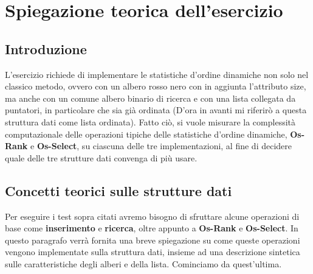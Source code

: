 \section{Spiegazione teorica dell'esercizio}
\subsection{Introduzione}
L'esercizio richiede di implementare le statistiche d'ordine dinamiche non solo nel classico metodo, ovvero con un albero rosso nero con in aggiunta l'attributo size, ma anche con un comune albero binario di ricerca e con una lista collegata da puntatori, in particolare che sia già ordinata (D'ora in avanti mi riferirò a questa struttura dati come lista ordinata). Fatto ciò, si vuole misurare la complessità computazionale delle operazioni tipiche delle statistiche d'ordine dinamiche, \textbf{Os-Rank} e \textbf{Os-Select}, su ciascuna delle tre implementazioni, al fine di decidere quale delle tre strutture dati convenga di più usare.

\subsection{Concetti teorici sulle strutture dati}
Per eseguire i test sopra citati avremo bisogno di sfruttare alcune operazioni di base come \textbf{inserimento} e \textbf{ricerca}, oltre appunto a \textbf{Os-Rank} e \textbf{Os-Select}. In questo paragrafo verrà fornita una breve spiegazione su come queste operazioni vengono implementate sulla struttura dati, insieme ad una descrizione sintetica sulle caratteristiche degli alberi e della lista. Cominciamo da quest'ultima.

